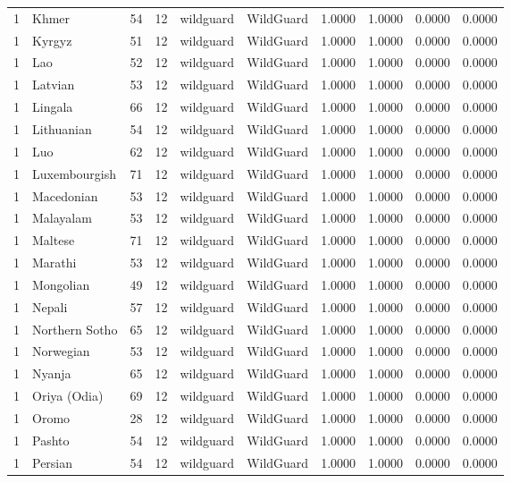 \begin{tabular}{rlrrllrrrr}
1 & Khmer & 54 & 12 & wildguard & WildGuard & 1.0000 & 1.0000 & 0.0000 & 0.0000 \\
1 & Kyrgyz & 51 & 12 & wildguard & WildGuard & 1.0000 & 1.0000 & 0.0000 & 0.0000 \\
1 & Lao & 52 & 12 & wildguard & WildGuard & 1.0000 & 1.0000 & 0.0000 & 0.0000 \\
1 & Latvian & 53 & 12 & wildguard & WildGuard & 1.0000 & 1.0000 & 0.0000 & 0.0000 \\
1 & Lingala & 66 & 12 & wildguard & WildGuard & 1.0000 & 1.0000 & 0.0000 & 0.0000 \\
1 & Lithuanian & 54 & 12 & wildguard & WildGuard & 1.0000 & 1.0000 & 0.0000 & 0.0000 \\
1 & Luo & 62 & 12 & wildguard & WildGuard & 1.0000 & 1.0000 & 0.0000 & 0.0000 \\
1 & Luxembourgish & 71 & 12 & wildguard & WildGuard & 1.0000 & 1.0000 & 0.0000 & 0.0000 \\
1 & Macedonian & 53 & 12 & wildguard & WildGuard & 1.0000 & 1.0000 & 0.0000 & 0.0000 \\
1 & Malayalam & 53 & 12 & wildguard & WildGuard & 1.0000 & 1.0000 & 0.0000 & 0.0000 \\
1 & Maltese & 71 & 12 & wildguard & WildGuard & 1.0000 & 1.0000 & 0.0000 & 0.0000 \\
1 & Marathi & 53 & 12 & wildguard & WildGuard & 1.0000 & 1.0000 & 0.0000 & 0.0000 \\
1 & Mongolian & 49 & 12 & wildguard & WildGuard & 1.0000 & 1.0000 & 0.0000 & 0.0000 \\
1 & Nepali & 57 & 12 & wildguard & WildGuard & 1.0000 & 1.0000 & 0.0000 & 0.0000 \\
1 & Northern Sotho & 65 & 12 & wildguard & WildGuard & 1.0000 & 1.0000 & 0.0000 & 0.0000 \\
1 & Norwegian & 53 & 12 & wildguard & WildGuard & 1.0000 & 1.0000 & 0.0000 & 0.0000 \\
1 & Nyanja & 65 & 12 & wildguard & WildGuard & 1.0000 & 1.0000 & 0.0000 & 0.0000 \\
1 & Oriya (Odia) & 69 & 12 & wildguard & WildGuard & 1.0000 & 1.0000 & 0.0000 & 0.0000 \\
1 & Oromo & 28 & 12 & wildguard & WildGuard & 1.0000 & 1.0000 & 0.0000 & 0.0000 \\
1 & Pashto & 54 & 12 & wildguard & WildGuard & 1.0000 & 1.0000 & 0.0000 & 0.0000 \\
1 & Persian & 54 & 12 & wildguard & WildGuard & 1.0000 & 1.0000 & 0.0000 & 0.0000 \\

\end{tabular}
